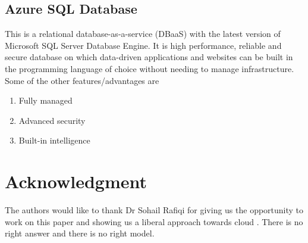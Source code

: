 \documentclass[journal]{hybrid-cloud}
\begin{document}
\subsection{Azure SQL Database}
This is a relational database-as-a-service (DBaaS) with the latest version of Microsoft SQL Server Database Engine. It is high performance, reliable and secure database on which data-driven applications and websites can be built in the programming language of choice without needing to manage infrastructure. Some of the other features/advantages are  \cite{AzureSQLDB}

\begin{enumerate}
	\item Fully managed
	\item Advanced security
	\item Built-in intelligence
\end{enumerate}



\section*{Acknowledgment}


The authors would like to thank Dr Sohail Rafiqi for giving us the opportunity to work on this paper and showing us a liberal approach towards cloud . There is no right answer and there is no right model. 

\ifCLASSOPTIONcaptionsoff
  \newpage
\fi







\end{document}
